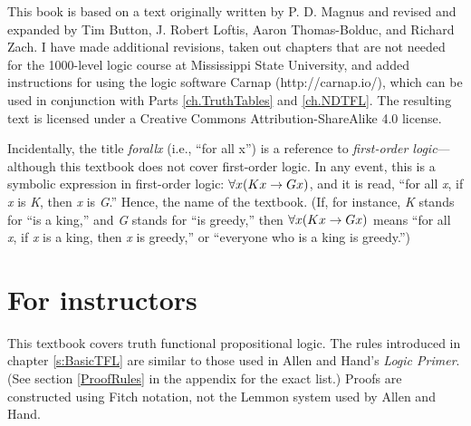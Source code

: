 This book is based on a text originally written by P. D. Magnus and revised and expanded by Tim Button, J. Robert Loftis, Aaron Thomas-Bolduc, and Richard Zach. I have made additional revisions, taken out chapters that are not needed for the 1000-level logic course at Mississippi State University, and added instructions for using the logic software Carnap (http://carnap.io/), which can be used in conjunction with Parts \ref{ch.TruthTables} and \ref{ch.NDTFL}. The resulting text is licensed under a Creative Commons Attribution-ShareAlike 4.0 license.

Incidentally, the title \textit{forall\hspace{.10em}x} (i.e., ``for all x'') is a reference to \textit{first-order logic}---although this textbook does not cover first-order logic. In any event, this is a symbolic expression in first-order logic: $\forall x(Kx \rightarrow Gx)$, and it is read, “for all \textit{x}, if \textit{x} is \textit{K}, then \textit{x} is \textit{G}.” Hence, the name of the textbook. (If, for instance, \textit{K} stands for ``is a king,'' and \textit{G} stands for ``is greedy,'' then $\forall x(Kx \rightarrow Gx)$ means ``for all \textit{x}, if \textit{x} is a king, then \textit{x} is greedy,'' or ``everyone who is a king is greedy.'') 


\section{For instructors}

This textbook covers truth functional propositional logic. The rules introduced in chapter \ref{s:BasicTFL} are similar to those used in Allen and Hand's \textit{Logic Primer}. (See section \ref{ProofRules} in the appendix for the exact list.) Proofs are constructed using Fitch notation, not the Lemmon system used by Allen and Hand.
